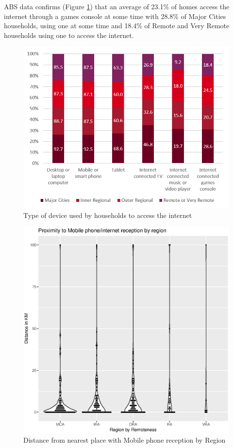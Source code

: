  ABS data confirms (Figure \ref{fig:absaccessmethods}) that an average of 23.1\% of homes access the internet through a games console at some time with 28.8\% of Major Cities households, using one at some time and 18.4\% of Remote and Very Remote households using one to access the internet.

\begin{figure}[ht]
\centering
\includegraphics[scale=0.75]{figures/AccessMethodByRemoteness.png}
\caption{Type of device used by households to access the internet\cite[Table 3]{RefWorks:459}\label{fig:absaccessmethods}}
\end{figure}


\begin{figure}[ht]
\centering
\includegraphics[scale=0.5]{figures/Vchart10-Proximity2MobileServiceArea.eps}
\caption{Distance from nearest place with Mobile phone reception by Region} \label{fig:VC010MobileAreaProxRegions}
\end{figure}


